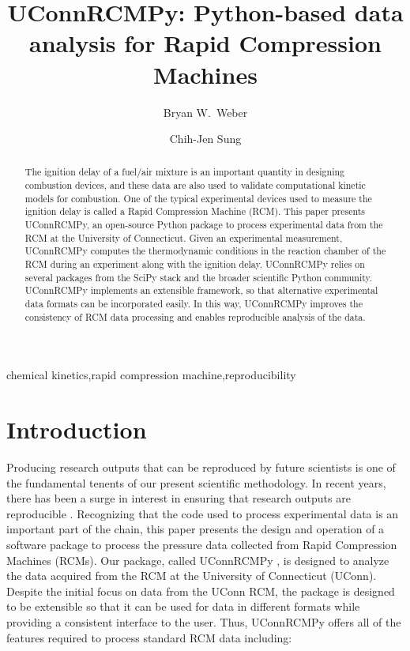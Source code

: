 \documentclass[12pt]{../ussci}
\title{ UConnRCMPy: Python-based data analysis for Rapid Compression Machines }
\author[1*]{Bryan W.\ Weber}
\author[1]{Chih-Jen Sung}
\affil[1]{Department of Mechanical Engineering, University of Connecticut, Storrs,
CT, USA}
\affil[*]{Corresponding Author: \email{bryan.weber@uconn.edu}}
\begin{document}
\maketitle

\begin{abstract} %
    The ignition delay of a fuel/air mixture is an important quantity in
    designing combustion devices, and these data are also used to validate
    computational kinetic models for combustion. One of the typical
    experimental devices used to measure the ignition delay is called a
    Rapid Compression Machine (RCM). This paper presents UConnRCMPy, an
    open-source Python package to process experimental data from the RCM at
    the University of Connecticut. Given an experimental measurement,
    UConnRCMPy computes the thermodynamic conditions in the reaction chamber
    of the RCM during an experiment along with the ignition delay.
    UConnRCMPy relies on several packages from the SciPy stack and the
    broader scientific Python community. UConnRCMPy implements an extensible
    framework, so that alternative experimental data formats can be
    incorporated easily. In this way, UConnRCMPy improves the consistency of
    RCM data processing and enables reproducible analysis of the data.
\end{abstract}

\begin{keyword}
    chemical kinetics\sep rapid compression machine\sep reproducibility
\end{keyword}

\section{Introduction}\label{introduction}

Producing research outputs that can be reproduced by future scientists is one of
the fundamental tenents of our present scientific methodology. In recent years,
there has been a surge in interest in ensuring that research outputs are
reproducible \autocite{NatureEds2016}. Recognizing that the code used to process
experimental data is an important part of the chain, this paper presents the
design and operation of a software package to process the pressure data
collected from Rapid Compression Machines (RCMs). Our package, called UConnRCMPy
\autocite{uconnrcmpy}, is designed to analyze the data acquired from the RCM at
the University of Connecticut (UConn). Despite the initial focus on data from
the UConn RCM, the package is designed to be extensible so that it can be used
for data in different formats while providing a consistent interface to the
user. Thus, UConnRCMPy offers all of the features required to process standard
RCM data including:
\end{document}
